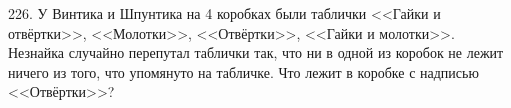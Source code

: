 226. У Винтика и Шпунтика на 4 коробках были таблички <<Гайки и отвёртки>>, <<Молотки>>, <<Отвёртки>>, <<Гайки и молотки>>. Незнайка случайно перепутал таблички так, что ни в одной из коробок не лежит ничего из того, что упомянуто на табличке. Что лежит в коробке с надписью <<Отвёртки>>?\\
